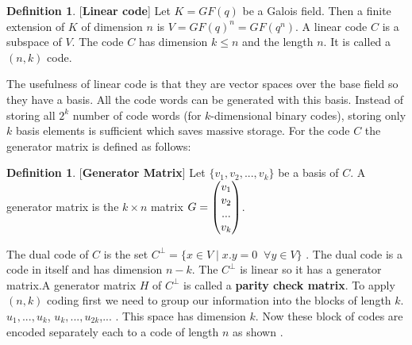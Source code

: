 \documentclass[a4paper,twoside,10pt]{article}
\theoremstyle{plain}
\theoremstyle{definition}
\newtheorem{definition}[theorem]{Definition}
\begin{document}
\begin{definition} \cite{error_correct} [\textbf{Linear code}]
  \label{linear}
Let \(K=GF(q)\) be a Galois field. Then a finite extension of \(K\) of dimension \(n\) is \(V=GF(q)^n=GF(q^n)\). A linear code \(C\) is a subspace of \(V\). The code \(C\) has dimension \(k \leq n\) and the length \(n\). It is called a \((n,k)\) code.
\end{definition}

\noindent
The usefulness of linear code is that they are vector spaces over the base field so they have a basis. All the code words can be generated with this basis. Instead of storing all \(2^k\) number of code words (for \(k\)-dimensional binary codes), storing only \(k\) basis elements is sufficient which saves massive storage. For the code \(C\) the generator matrix is defined as follows:

\begin{definition} \cite{error_correct} [\textbf{Generator Matrix}]
  Let \(\{v_1, v_2,...,v_k\}\) be a basis of \(C\). A generator matrix is the \(k \times n\) matrix \(G=\begin{pmatrix} \small
      v_1\\
      v_2\\
      ...\\
      v_k
    \end{pmatrix}
  \).
\end{definition}

\noindent
The dual code of \(C\) is the set \(C^{\perp}=\{x \in V \;| \; x.y=0 \;\; \forall y \in V \}\) \cite{error_correct}. The dual code is a code in itself and has dimension \(n-k\). The \(C^{\perp}\) is linear so it has a generator matrix.A generator matrix \(H\) of \(C^{\perp}\) is called a \textbf{parity check matrix}. To apply \((n,k)\) coding first we need to group our information into the blocks of length \(k\). \(u_1,...,u_k\),  \(u_k,...,u_{2k}\),... . This space has dimension \(k\). Now these block of codes are encoded separately each to a code of length \(n\) as shown \cite{coding}.

\vspace{5mm}
\end{document}
